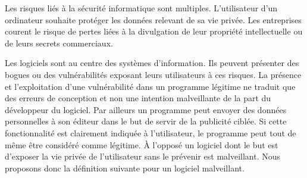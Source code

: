 Les risques liés à la sécurité informatique sont multiples.
L'utilisateur d'un ordinateur souhaite protéger les données relevant de sa vie privée.
Les entreprises courent le risque de pertes liées à la divulgation de leur propriété intellectuelle ou de leurs secrets commerciaux.

Les logiciels sont au centre des systèmes d'information. Ils peuvent présenter des bogues ou des vulnérabilités exposant leurs utilisateurs à ces risques.
La présence et l'exploitation d'une vulnérabilité dans un programme légitime ne traduit que des erreurs de conception et non une intention malveillante de la part du développeur du logiciel.
Par ailleurs un programme peut envoyer des données personnelles à son éditeur dans le but de servir de la publicité ciblée. 
Si cette fonctionnalité est clairement indiquée à l'utilisateur, le programme peut tout de même être considéré comme légitime.
À l'opposé un logiciel dont le but est d'exposer la vie privée de l'utilisateur sans le prévenir est malveillant.
Nous proposons donc la définition suivante pour un logiciel malveillant.
\\





